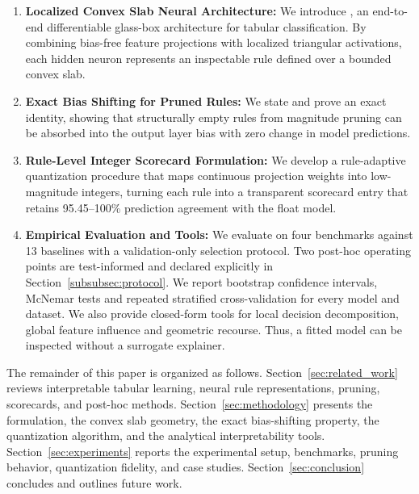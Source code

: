 \begin{enumerate}
    \item \textbf{Localized Convex Slab Neural Architecture:} We introduce \modelname{}, an end-to-end differentiable glass-box architecture for tabular classification. By combining bias-free feature projections with localized triangular activations, each hidden neuron represents an inspectable rule defined over a bounded convex slab.
    \item \textbf{Exact Bias Shifting for Pruned Rules:} We state and prove an exact identity, showing that structurally empty rules from magnitude pruning can be absorbed into the output layer bias with zero change in model predictions.
    \item \textbf{Rule-Level Integer Scorecard Formulation:} We develop a rule-adaptive
    quantization procedure that maps continuous projection weights into low-magnitude
    integers, turning each rule into a transparent scorecard entry that retains
    95.45--100\% prediction agreement with the float model.
    \item \textbf{Empirical Evaluation and Tools:} We evaluate \modelname{} on four
    benchmarks against 13 baselines with a validation-only selection protocol. Two
    post-hoc operating points are test-informed and declared explicitly in
    Section~\ref{subsubsec:protocol}. We report bootstrap confidence intervals,
    McNemar tests and repeated stratified cross-validation for every model and
    dataset. We also provide closed-form tools for local decision decomposition, global
    feature influence and geometric recourse. Thus, a fitted model can be inspected
    without a surrogate explainer.
\end{enumerate}


The remainder of this paper is organized as follows.
Section~\ref{sec:related_work} reviews interpretable tabular learning, neural rule
representations, pruning, scorecards, and post-hoc methods.
Section~\ref{sec:methodology} presents the formulation, the convex slab geometry,
the exact bias-shifting property, the quantization algorithm, and the analytical
interpretability tools. Section~\ref{sec:experiments} reports the experimental
setup, benchmarks, pruning behavior, quantization fidelity, and case studies.
Section~\ref{sec:conclusion} concludes and outlines future work.

